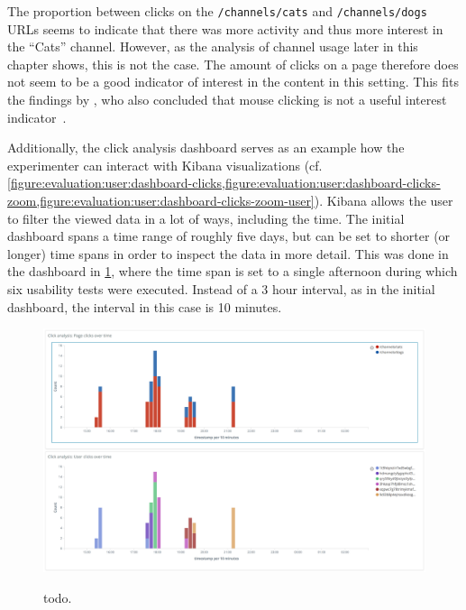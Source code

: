 The proportion between clicks on the \texttt{/channels/cats} and \texttt{/channels/dogs} URLs seems to indicate that there was more activity and thus more interest in the ``Cats'' channel.
However, as the analysis of channel usage later in this chapter shows, this is not the case.
The amount of clicks on a page therefore does not seem to be a good indicator of interest in the content in this setting.
This fits the findings by \cite{Claypool2001}, who also concluded that mouse clicking is not a useful interest indicator~\cite{Claypool2001}.

Additionally, the click analysis dashboard serves as an example how the experimenter can interact with Kibana visualizations (cf. \cref{figure:evaluation:user:dashboard-clicks,figure:evaluation:user:dashboard-clicks-zoom,figure:evaluation:user:dashboard-clicks-zoom-user}).
Kibana allows the user to filter the viewed data in a lot of ways, including the time.
The initial dashboard spans a time range of roughly five days, but can be set to shorter (or longer) time spans in order to inspect the data in more detail.
This was done in the dashboard in \cref{figure:evaluation:user:dashboard-clicks-zoom}, where the time span is set to a single afternoon during which six usability tests were executed.
Instead of a 3 hour interval, as in the initial dashboard, the interval in this case is 10 minutes.

\begin{figure}[h]
        \caption{todo.}
        \includegraphics[width=1.1\textwidth]{gfx/dashboard-clicks-zoom.png}
        \label{figure:evaluation:user:dashboard-clicks-zoom}
\end{figure}

